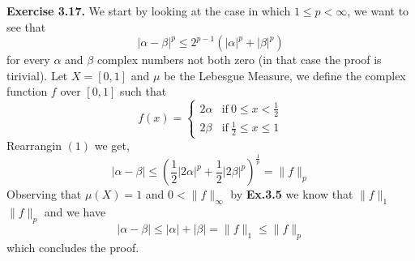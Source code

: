 \documentclass{article}
\begin{document}
\pagebreak

\begin{exercise}\textbf{Exercise 3.17.}
   We start by looking at the case in which $1 \le  p < \infty$, we want to see that
   \begin{equation}
       | \alpha - \beta |^p \le 2^{p-1} \left( |\alpha|^p + |\beta|^p \right) 
   \end{equation}
   for every $\alpha$ and $\beta$ complex numbers not both zero (in that case the proof is tirivial). Let $X = [0,1]$ and $\mu$ be the Lebesgue Measure, we define the complex function $f$ over $[0,1]$ such that
   \[
       f \left( x \right) =  
       \begin{cases}
           2\alpha & \text{if}\  0 \le x < \frac{1}{2} \\
           2\beta & \text{if}\  \frac{1}{2} \le x \le 1
       \end{cases}
   \]
   Rearrangin $ \left( 1 \right) $ we get,
   \begin{equation}
       |\alpha - \beta| \le \left( \frac{1}{2} | 2\alpha |^p + \frac{1}{2} | 2\beta | ^p \right) ^{\frac{1}{p}} = \|f\|_p 
   \end{equation}
   Observing that $\mu \left( X \right) = 1$ and $0 < \|f\|_\infty $ by \textbf{Ex.3.5} we know that $\|f\|_1 $ \le $\|f\|_p $ and we have
   \begin{equation}
       |\alpha - \beta| \le |\alpha| + |\beta| = \|f\|_1 \le \|f\|_p 
   \end{equation}
   which concludes the proof. 


\end{exercise}

\bigbreak
\end{document}
